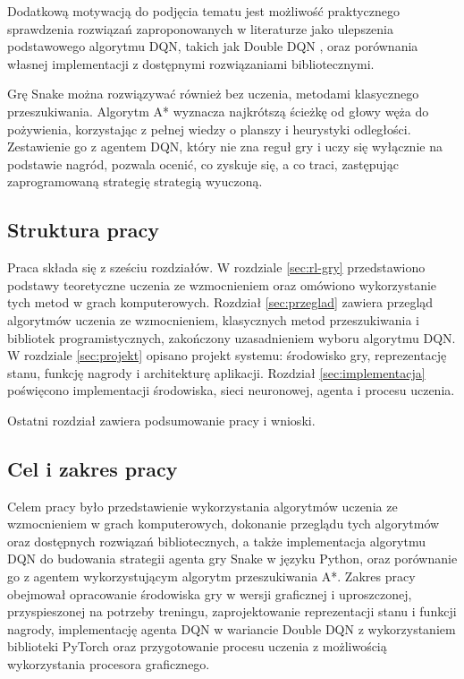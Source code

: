 Dodatkową motywacją do podjęcia tematu jest możliwość praktycznego sprawdzenia rozwiązań zaproponowanych w literaturze jako ulepszenia podstawowego algorytmu DQN, takich jak Double DQN \cite{vanhasselt2016}, oraz porównania własnej implementacji z dostępnymi rozwiązaniami bibliotecznymi.

Grę Snake można rozwiązywać również bez uczenia, metodami klasycznego przeszukiwania. Algorytm A* \cite{hart1968} wyznacza najkrótszą ścieżkę od głowy węża do pożywienia, korzystając z pełnej wiedzy o planszy i heurystyki odległości. Zestawienie go z agentem DQN, który nie zna reguł gry i uczy się wyłącznie na podstawie nagród, pozwala ocenić, co zyskuje się, a co traci, zastępując zaprogramowaną strategię strategią wyuczoną.
\subsection{Struktura pracy}
\label{subsec:struktura}

Praca składa się z sześciu rozdziałów. W rozdziale \ref{sec:rl-gry} przedstawiono podstawy teoretyczne uczenia ze wzmocnieniem oraz omówiono wykorzystanie tych metod w grach komputerowych. Rozdział \ref{sec:przeglad} zawiera przegląd algorytmów uczenia ze wzmocnieniem, klasycznych metod przeszukiwania i bibliotek programistycznych, zakończony uzasadnieniem wyboru algorytmu DQN. W rozdziale \ref{sec:projekt} opisano projekt systemu: środowisko gry, reprezentację stanu, funkcję nagrody i architekturę aplikacji. Rozdział \ref{sec:implementacja} poświęcono implementacji środowiska, sieci neuronowej, agenta i procesu uczenia.

Ostatni rozdział zawiera podsumowanie pracy i wnioski.

\subsection{Cel i zakres pracy}
\label{subsec:cel}

Celem pracy było przedstawienie wykorzystania algorytmów uczenia ze wzmocnieniem w grach komputerowych, dokonanie przeglądu tych algorytmów oraz dostępnych rozwiązań bibliotecznych, a także implementacja algorytmu DQN do budowania strategii agenta gry Snake w języku Python, oraz porównanie go z agentem wykorzystującym algorytm przeszukiwania A*. Zakres pracy obejmował opracowanie środowiska gry w wersji graficznej i uproszczonej, przyspieszonej na potrzeby treningu, zaprojektowanie reprezentacji stanu i funkcji nagrody, implementację agenta DQN w wariancie Double DQN z wykorzystaniem biblioteki PyTorch oraz przygotowanie procesu uczenia z możliwością wykorzystania procesora graficznego.
